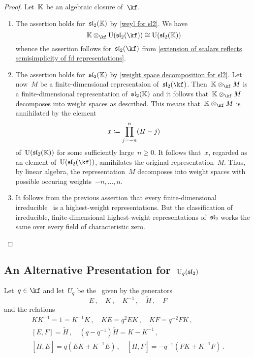 \documentclass[a4paper, 11pt, oneside]{scrartcl}
\begin{document}
\begin{proof}
  Let~$\mathbb{K}$ be an algebraic closure of~$\kf$.
  \begin{enumerate}
    \item
      The assertion holds for~$\mathfrak{sl}_2(\mathbb{K})$ by \cref{weyl for sl2}.
      We have
      \[
        \Kf \tensor_{\kf} \Univ(\sllie_2(\kf))
        \cong
        \Univ(\sllie_2(\Kf))
      \]
      whence the assertion follows for~$\sllie_2(\kf)$ from \cref{extension of scalars reflects semisimplicity of fd representations}.
    \item
      The assertion holds for~$\mathfrak{sl}_2(\mathbb{K})$ by \cref{weight space decomposition for sl2}.
      Let now~$M$ be a finite-dimensional representaion of~$\sllie_2(\kf)$.
      Then~$\Kf \tensor_{\kf} M$ is a finite-dimensional representation of~$\mathfrak{sl}_2(\mathbb{K})$ and it follows that~$\Kf \tensor_{\kf} M$ decomposes into weight spaces as described.
      This means that~$\Kf \tensor_{\kf} M$ is annihilated by the element
      \[
        x \coloneqq \prod_{j=-n}^n (H - j)
      \]
      of~$\operatorname{U}(\mathfrak{sl}_2(\mathbb{K}))$ for some sufficiently large~$n \geq 0$.
      It follows that~$x$, regarded as an element of~$\Univ(\sllie_2(\kf))$, annihilates the original representation~$M$.
      Thus, by linear algebra, the representation~$M$ decomposes into weight spaces with possible occuring weights~$-n, \dotsc, n$.
    \item
      It follows from the previous assertion that every finite-dimensional irreducible~ is a highest-weight representations.
      But the classification of irreducible, finite-dimensional highest-weight representations of~$\mathfrak{sl}_2$ works the same over every field of characteristic zero.
    \qedhere
  \end{enumerate}
\end{proof}



\subsection{An Alternative Presentation for~\texorpdfstring{$\operatorname{U}_q(\mathfrak{sl}_2)$}{Uq(sl2)}}
\label{alternative presentation for quantum sl2}

Let~$q \in \kf$ and let~$U_q$ be the~\algebra{$\kf$} given by the generators
\[
  E \,,
  \quad
  K \,,
  \quad
  K^{-1}  \,,
  \quad
  \widetilde{H} \,,
  \quad
  F
\]
and the relations
\begin{gather*}
  K K^{-1} = 1 = K^{-1} K \,,
  \quad
  KE = q^2 EK \,,
  \quad
  KF = q^{-2} FK \,,
  \\
  [E,F] = \widetilde{H} \,,
  \quad
  (q - q^{-1}) \widetilde{H} = K - K^{-1} \,,
  \\
  [\widetilde{H}, E] = q(EK + K^{-1} E) \,,
  \quad
  [\widetilde{H}, F] = -q^{-1}(FK + K^{-1} F) \,.
\end{gather*}
\end{document}

